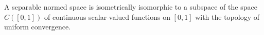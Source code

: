 A separable normed space is isometrically isomorphic to a subspace of the space $C([0,1])$ of continuous scalar-valued functions on $[0,1]$ with the topology of uniform convergence.
